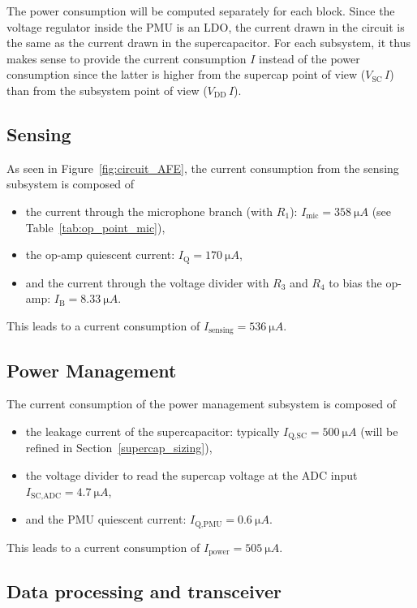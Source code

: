 \documentclass{EPL-master-thesis-covers-EN}
\newcommand{\te}[1]{\textrm{#1}}
\begin{document}
The power consumption will be computed separately for each block. Since the voltage regulator inside the PMU is an LDO, the current drawn in the circuit is the same as the current drawn in the supercapacitor. For each subsystem, it thus makes sense to provide the current consumption $I$ instead of the power consumption since the latter is higher from the supercap point of view ($V_\te{SC}\,I$) than from the subsystem point of view ($V_\te{DD}\,I$).


\subsection*{Sensing}

As seen in Figure~\ref{fig:circuit_AFE}, the current consumption from the sensing subsystem is composed of
\begin{itemize}
 \item the current through the microphone branch (with $R_1$): $I_{\te{mic}} = \SI{358}{\micro A}$ (see Table~\ref{tab:op_point_mic}),
 \item the op-amp quiescent current: $I_\te{Q} = \SI{170}{\micro A}$,
 \item and the current through the voltage divider with $R_3$ and $R_4$ to bias the op-amp: $I_\te{B} = \SI{8.33}{\micro A}$.
\end{itemize}

This leads to a current consumption of $I_\te{sensing} = \SI{536}{\micro A}$.

\subsection*{Power Management}

The current consumption of the power management subsystem is composed of
\begin{itemize}
 \item the leakage current of the supercapacitor: typically $I_\te{Q,SC} = \SI{500}{\micro A}$ (will be refined in Section~\ref{supercap_sizing}),
 \item the voltage divider to read the supercap voltage at the ADC input $I_\te{SC,ADC} = \SI{4.7}{\micro A}$,
 \item and the PMU quiescent current: $I_\te{Q,PMU} = \SI{0.6}{\micro A}$.
\end{itemize}

This leads to a current consumption of $I_\te{power} = \SI{505}{\micro A}$.


\subsection*{Data processing and transceiver}
\end{document}

